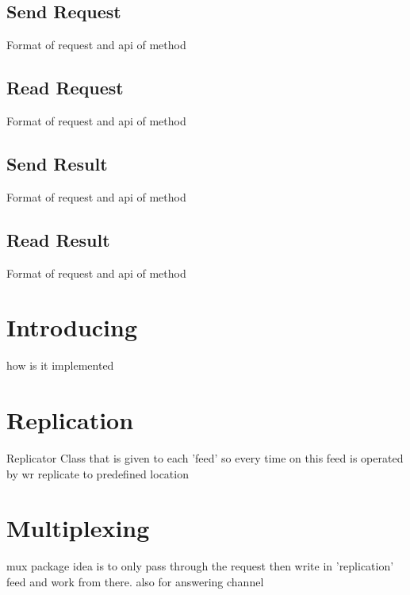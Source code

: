 \subsection{Send Request}
Format of request and api of method
\subsection{Read Request}
Format of request and api of method
\subsection{Send Result}
Format of request and api of method
\subsection{Read Result}
Format of request and api of method
\section{Introducing}
how is it implemented
\section{Replication}
Replicator Class that is given to each 'feed' so every time on this feed is operated by wr replicate to predefined location
\section{Multiplexing}
mux package idea is to only pass through the request then write in 'replication' feed and work from there.
also for answering channel

